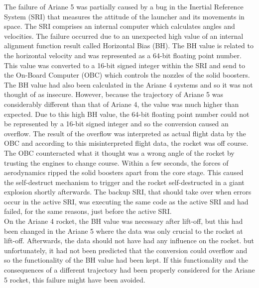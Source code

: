 The failure of Ariane 5 was partially caused by a bug in the Inertial Reference System (SRI) that measures the attitude of the launcher and its movements in space. The SRI comprises an internal computer which calculates angles and velocities.
The failure occurred due to an unexpected high value of an internal alignment function result called Horizontal Bias (BH). The BH value is related to the horizontal velocity and was represented as a 64-bit floating point number. This value was converted to a 16-bit signed integer within the SRI and send to the On-Board Computer (OBC) which controls the nozzles of the solid boosters.\\

The BH value had also been calculated in the Ariane 4 systems and so it was not thought of as insecure. However, because the trajectory of Ariane 5 was considerably different than that of Ariane 4, the value was much higher than expected. Due to this high BH value, the 64-bit floating point number could not be represented by a 16-bit signed integer and so the conversion caused an overflow.
The result of the overflow was interpreted as actual flight data by the OBC and according to this misinterpreted flight data, the rocket was off course. The OBC counteracted what it thought was a wrong angle of the rocket by trusting the engines to change course. Within a few seconds, the forces of aerodynamics ripped the solid boosters apart from the core stage. This caused the self-destruct mechanism to trigger and the rocket self-destructed in a giant explosion shortly afterwards. The backup SRI, that should take over when errors occur in the active SRI, was executing the same code as the active SRI and had failed, for the same reasons, just before the active SRI.\\

On the Ariane 4 rocket, the BH value was necessary after lift-off, but this had been changed in the Ariane 5 where the data was only crucial to the rocket at lift-off. Afterwards, the data should not have had any influence on the rocket. but unfortunately, it had not been predicted that the conversion could overflow and so the functionality of the BH value had been kept. If this functionality and the consequences of a different trajectory had been properly considered for the Ariane 5 rocket, this failure might have been avoided.
